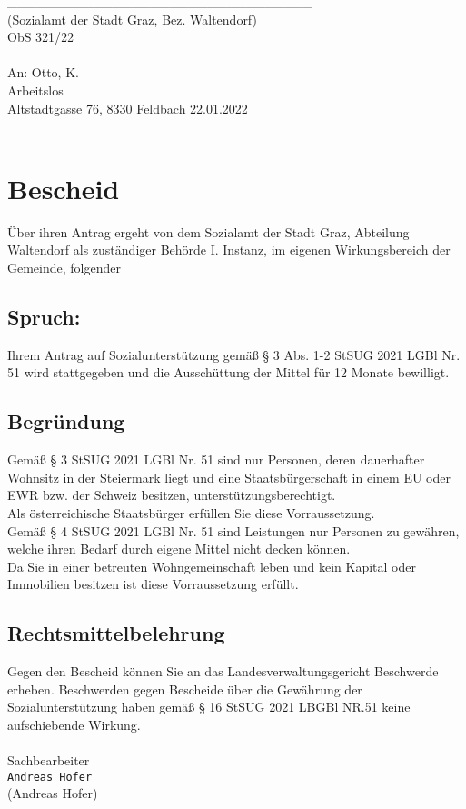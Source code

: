 \documentclass{article}
\begin{document}
	\_\_\_\_\_\_\_\_\_\_\_\_\_\_\_\_\_\_\_\_\_\_\_\_\_\_\_\_\_\_\_\_ \\
	(Sozialamt der Stadt Graz, Bez. Waltendorf) \\
	ObS 321/22 \\ \\

	An: Otto, K. \\
	Arbeitslos \\
	Altstadtgasse 76, 8330 Feldbach \hspace{10cm} 22.01.2022 \\ \\
	\section*{Bescheid}
	\vspace{5pt}
	Über ihren Antrag ergeht von dem Sozialamt der Stadt Graz, Abteilung Waltendorf als zuständiger Behörde I. Instanz, im eigenen Wirkungsbereich der Gemeinde, folgender
	\subsection*{Spruch:}
	Ihrem Antrag auf Sozialunterstützung gemäß § 3 Abs. 1-2 StSUG 2021 LGBl Nr. 51 wird stattgegeben und die Ausschüttung der Mittel für 12 Monate bewilligt.
	\subsection*{Begründung}
	Gemäß § 3 StSUG 2021 LGBl Nr. 51 sind nur Personen, deren dauerhafter Wohnsitz in der Steiermark liegt und eine Staatsbürgerschaft in einem EU oder EWR bzw. der Schweiz besitzen, unterstützungsberechtigt. \\
	Als österreichische Staatsbürger erfüllen Sie diese Vorraussetzung. \\
	Gemäß § 4 StSUG 2021 LGBl Nr. 51 sind Leistungen nur Personen zu gewähren, welche ihren Bedarf durch eigene Mittel nicht decken können.  \\
	Da Sie in einer betreuten Wohngemeinschaft leben und kein Kapital oder Immobilien besitzen ist diese Vorraussetzung erfüllt.
	\subsection*{Rechtsmittelbelehrung}
	Gegen den Bescheid können Sie an das Landesverwaltungsgericht Beschwerde erheben. Beschwerden gegen Bescheide über die Gewährung der Sozialunterstützung haben gemäß § 16 StSUG 2021 LBGBl NR.51 keine aufschiebende Wirkung. \\ \\
	Sachbearbeiter \\
	\texttt{\small{Andreas Hofer}} \\
	(Andreas Hofer)




	
\end{document}
